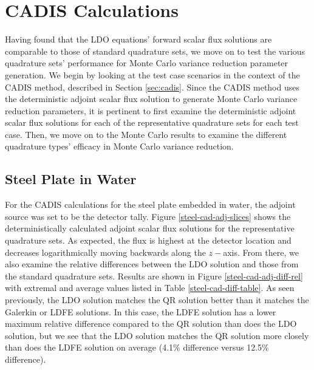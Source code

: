 \FloatBarrier
\section{CADIS Calculations}
\label{sec:cad}

Having found that the LDO equations' forward scalar flux solutions are comparable to
those of standard quadrature sets, we move on to test the various quadrature sets'
performance for Monte Carlo variance reduction parameter generation. We begin by
looking at the test case scenarios in the context of the CADIS method, described in
Section \ref{sec:cadis}. Since the CADIS method uses the deterministic adjoint scalar
flux solution to generate Monte Carlo variance reduction parameters, it is pertinent
to first examine the deterministic adjoint scalar flux solutions for each of the
representative quadrature sets for each test case. Then, we move on to the Monte Carlo
results to examine the different quadrature types' efficacy in Monte Carlo variance
reduction.

\subsection{Steel Plate in Water}
\label{sec:steel-cad}

For the CADIS calculations for the steel plate embedded in water, the adjoint source
was set to be the detector tally. Figure \ref{steel-cad-adj-slices} shows the 
deterministically calculated adjoint scalar flux solutions for the representative
quadrature sets. As expected, the flux is highest at the detector location and
decreases logarithmically moving backwards along the $z-$axis. From there, we also 
examine the relative differences between the LDO solution and those from the standard
quadrature sets. Results are shown in Figure \ref{steel-cad-adj-diff-rel} with
extremal and average values listed in Table \ref{steel-cad-diff-table}. As seen
previously, the LDO solution matches the QR solution better than it matches the 
Galerkin or LDFE solutions. In this case, the LDFE solution has a lower maximum relative
difference compared to the QR solution than does the LDO solution, but we see that the LDO
solution matches the QR solution more closely than does the LDFE solution on average (4.1\%
difference versus 12.5\% difference).

